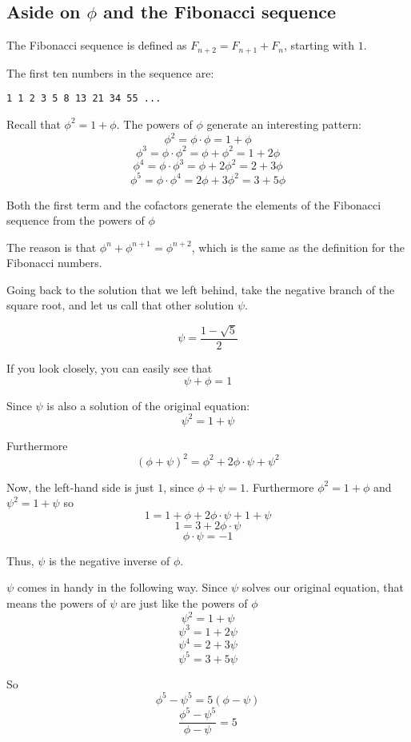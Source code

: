 \documentclass[11pt, oneside]{article}
\begin{document}
\subsection*{Aside on $\phi$ and the Fibonacci sequence}

The Fibonacci sequence is defined as $F_{n+2} = F_{n+1} + F_n$, starting with $1$.  

The first ten numbers in the sequence are:
\begin{verbatim}
1 1 2 3 5 8 13 21 34 55 ...
\end{verbatim}

Recall that $\phi^2 = 1 + \phi$.  The powers of $\phi$ generate an interesting pattern:
\[ \phi^2 = \phi \cdot \phi = 1 + \phi \]
\[ \phi^3 = \phi \cdot \phi^2 = \phi + \phi^2 = 1 + 2 \phi \]
\[ \phi^4 = \phi \cdot \phi^3 = \phi + 2 \phi^2 = 2 + 3 \phi \]
\[ \phi^5 = \phi \cdot \phi^4 = 2 \phi + 3 \phi^2 = 3 + 5 \phi \]

Both the first term and the cofactors generate the elements of the Fibonacci sequence from the powers of $\phi$

The reason is that $\phi^n + \phi^{n+1} = \phi^{n+2}$, which is the same as the definition for the Fibonacci numbers.

Going back to the solution that we left behind, take the negative branch of the square root, and let us call that other solution $\psi$.  

\[ \psi = \frac{1 - \sqrt{5}}{2} \]

If you look closely, you can easily see that
\[ \psi + \phi = 1 \]

Since $\psi$ is also a solution of the original equation:
\[ \psi^2 = 1 + \psi \]

Furthermore
\[ (\phi + \psi)^2 = \phi^2 + 2 \phi \cdot \psi + \psi^2 \]

Now, the left-hand side is just $1$, since $\phi + \psi = 1$.  Furthermore $\phi^2 = 1 + \phi$ and $\psi^2 = 1 + \psi$ so
\[ 1 = 1 + \phi + 2 \phi \cdot \psi + 1 + \psi \]
\[ 1 = 3 + 2  \phi \cdot \psi  \]
\[ \phi \cdot \psi = -1 \]

Thus, $\psi$ is the negative inverse of $\phi$.  

$\psi$ comes in handy in the following way.  Since $\psi$ solves our original equation, that means the powers of $\psi$ are just like the powers of $\phi$
\[ \psi^2 = 1 + \psi \]
\[ \psi^3 = 1 + 2 \psi \]
\[ \psi^4 = 2 + 3 \psi \]
\[ \psi^5 = 3 + 5 \psi \]

So
\[ \phi^5 - \psi^5 = 5(\phi - \psi) \]
\[ \frac{\phi^5 - \psi^5}{\phi - \psi} = 5 \]
\end{document}
